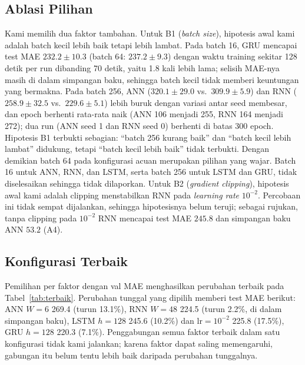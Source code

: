 \documentclass[conference,a4paper]{IEEEtran}
\begin{document}
\subsection{Ablasi Pilihan}
Kami memilih dua faktor tambahan. Untuk B1 (\textit{batch size}), hipotesis awal kami adalah batch kecil lebih baik tetapi lebih lambat. Pada batch 16, GRU mencapai test MAE $232.2\pm10.3$ (batch 64: $237.2\pm9.3$) dengan waktu training sekitar 128 detik per run dibanding 70 detik, yaitu 1.8 kali lebih lama; selisih MAE-nya masih di dalam simpangan baku, sehingga batch kecil tidak memberi keuntungan yang bermakna. Pada batch 256, ANN ($320.1\pm29.0$ vs.\ $309.9\pm5.9$) dan RNN ($258.9\pm32.5$ vs.\ $229.6\pm5.1$) lebih buruk dengan variasi antar seed membesar, dan epoch berhenti rata-rata naik (ANN 106 menjadi 255, RNN 164 menjadi 272); dua run (ANN seed 1 dan RNN seed 0) berhenti di batas 300 epoch. Hipotesis B1 terbukti sebagian: ``batch 256 kurang baik'' dan ``batch kecil lebih lambat'' didukung, tetapi ``batch kecil lebih baik'' tidak terbukti. Dengan demikian batch 64 pada konfigurasi acuan merupakan pilihan yang wajar. Batch 16 untuk ANN, RNN, dan LSTM, serta batch 256 untuk LSTM dan GRU, tidak diselesaikan sehingga tidak dilaporkan. Untuk B2 (\textit{gradient clipping}), hipotesis awal kami adalah clipping menstabilkan RNN pada \textit{learning rate} $10^{-2}$. Percobaan ini tidak sempat dijalankan, sehingga hipotesisnya belum teruji; sebagai rujukan, tanpa clipping pada $10^{-2}$ RNN mencapai test MAE $245.8$ dan simpangan baku ANN $53.2$ (A4).
 
\subsection{Konfigurasi Terbaik}
Pemilihan per faktor dengan val MAE menghasilkan perubahan terbaik pada Tabel~\ref{tab:terbaik}. Perubahan tunggal yang dipilih memberi test MAE berikut: ANN $W{=}6$ 269.4 (turun 13.1\%), RNN $W{=}48$ 224.5 (turun 2.2\%, di dalam simpangan baku), LSTM $h{=}128$ 245.6 (10.2\%) dan $\text{lr}{=}10^{-2}$ 225.8 (17.5\%), GRU $h{=}128$ 220.3 (7.1\%). Penggabungan semua faktor terbaik dalam satu konfigurasi tidak kami jalankan; karena faktor dapat saling memengaruhi, gabungan itu belum tentu lebih baik daripada perubahan tunggalnya.
 
\begin{table}[t]
  \centering
  \caption{Konfigurasi terbaik tiap model dari ablasi satu faktor (dipilih dengan val MAE) dan test MAE-nya, 3 seed.}
  \label{tab:terbaik}
\end{table}
 
\end{document}
